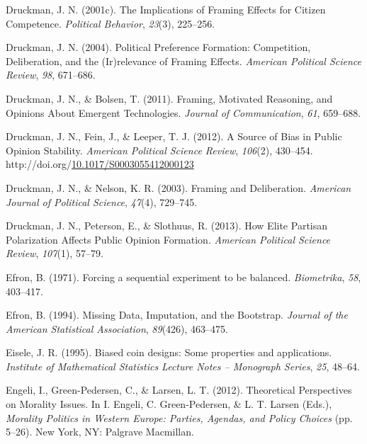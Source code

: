 \documentclass[12pt,econ]{sources/authesis}
\newenvironment{CSLReferences}%
  {}%
  {\par}
\begin{document}
\begin{CSLReferences}{1}{0}
\leavevmode{}%
Druckman, J. N. (2001c). The {Implications} of {Framing} {Effects} for {Citizen} {Competence}. \emph{Political Behavior}, \emph{23}(3), 225--256.

\leavevmode{}%
Druckman, J. N. (2004). {Political Preference Formation: Competition, Deliberation, and the (Ir)relevance of Framing Effects}. \emph{American Political Science Review}, \emph{98}, 671--686.

\leavevmode{}%
Druckman, J. N., \& Bolsen, T. (2011). Framing, {Motivated} {Reasoning}, and {Opinions} {About} {Emergent} {Technologies}. \emph{Journal of Communication}, \emph{61}, 659--688.

\leavevmode{}%
Druckman, J. N., Fein, J., \& Leeper, T. J. (2012). A {Source} of {Bias} in {Public} {Opinion} {Stability}. \emph{American Political Science Review}, \emph{106}(2), 430--454. http://doi.org/\href{https://doi.org/10.1017/S0003055412000123}{10.1017/S0003055412000123}

\leavevmode{}%
Druckman, J. N., \& Nelson, K. R. (2003). {Framing and Deliberation}. \emph{American Journal of Political Science}, \emph{47}(4), 729--745.

\leavevmode{}%
Druckman, J. N., Peterson, E., \& Slothuus, R. (2013). How {Elite} {Partisan} {Polarization} {Affects} {Public} {Opinion} {Formation}. \emph{American Political Science Review}, \emph{107}(1), 57--79.

\leavevmode{}%
Efron, B. (1971). Forcing a sequential experiment to be balanced. \emph{Biometrika}, \emph{58}, 403--417.

\leavevmode{}%
Efron, B. (1994). {Missing Data, Imputation, and the Bootstrap}. \emph{Journal of the American Statistical Association}, \emph{89}(426), 463--475.

\leavevmode{}%
Eisele, J. R. (1995). Biased coin designs: Some properties and applications. \emph{Institute of Mathematical Statistics Lecture Notes -- Monograph Series}, \emph{25}, 48--64.

\leavevmode{}%
Engeli, I., Green-Pedersen, C., \& Larsen, L. T. (2012). {Theoretical Perspectives on Morality Issues}. In I. Engeli, C. Green-Pedersen, \& L. T. Larsen (Eds.), \emph{{Morality Politics in Western Europe: Parties, Agendas, and Policy Choices}} (pp. 5--26). New York, NY: Palgrave Macmillan.


\end{CSLReferences}
\end{document}
